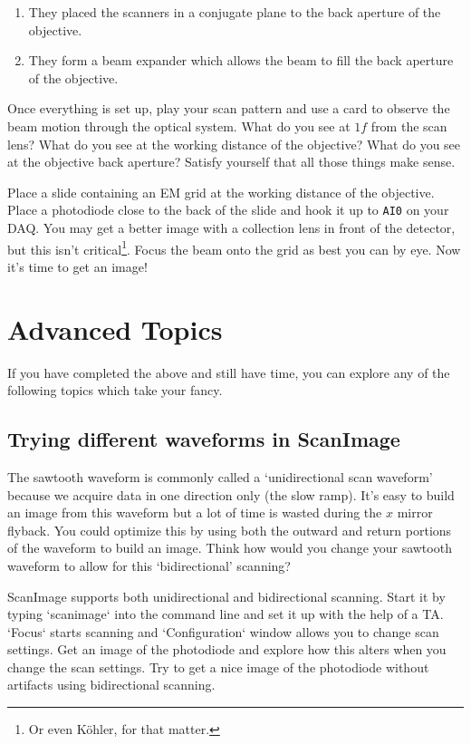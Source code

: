 \documentclass[a4paper]{report}
\begin{document}
\begin{enumerate}
\setlength\itemsep{0.1em}
\item They placed the scanners in a conjugate plane to the back aperture of the objective. 
\item They form a beam expander which allows the beam to fill the back aperture of the objective.
\end{enumerate}

\noindent
Once everything is set up, play your scan pattern and use a card to observe the beam motion through the optical system. 
What do you see at $1f$ from the scan lens?
What do you see at the working distance of the objective?
What do you see at the objective back aperture?
Satisfy yourself that all those things make sense.

\noindent
Place a slide containing an EM grid at the working distance of the objective. 
Place a photodiode close to the back of the slide and hook it up to \texttt{AI0} on your DAQ. 
You may get a better image with a collection lens in front of the detector, but this isn't critical\footnote{Or even K\"{o}hler, for that matter.}.
Focus the beam onto the grid as best you can by eye.
Now it's time to get an image!


\section{Advanced Topics}
If you have completed the above and still have time, you can explore any of the following topics which take your fancy.



\subsection{Trying different waveforms in ScanImage}
The sawtooth waveform is commonly called a `unidirectional scan waveform' because we acquire data in one direction only (the slow ramp). 
It's easy to build an image from this waveform but a lot of time is wasted during the $x$ mirror flyback. 
You could optimize this by using both the outward and return portions of the waveform to build an image. 
Think how would you change your sawtooth waveform to allow for this `bidirectional' scanning? 

ScanImage supports both unidirectional and bidirectional scanning. 
Start it by typing `scanimage` into the command line and set it up with the help of a TA. 
`Focus` starts scanning and `Configuration` window allows you to change scan settings. 
Get an image of the photodiode and explore how this alters when you change the scan settings. 
Try to get a nice image of the photodiode without artifacts using bidirectional scanning. 
\end{document}
